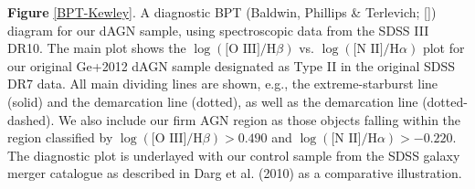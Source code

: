 \label{BPT-Kewley} \textbf{Figure} \ref{BPT-Kewley}. A diagnostic BPT (Baldwin, Phillips \& Terlevich; [\cite{Baldwin_1981}]) diagram for our dAGN sample, using spectroscopic data from the SDSS III DR10. The main plot shows the $\log(\text{[O III]}/\text{H}\beta)$ vs. $\log(\text{[N II]}/\text{H}\alpha)$ plot for our original Ge+2012 dAGN sample designated as Type II in the original SDSS DR7 data. All main dividing lines are shown, e.g., the \cite{Kewley_Dopita_Sutherland_Heisler_Trevena_2001} extreme-starburst line (solid) and the \cite{Kauffmann_2003} demarcation line (dotted), as well as the \cite{Stasinska_2006} demarcation line (dotted-dashed). We also include our firm AGN region as those objects falling within the region classified by $\log(\text{[O III]}/\text{H}\beta)>{0.490}$ and $\log(\text{[N II]}/\text{H}\alpha)>{-0.220}$. The diagnostic plot is underlayed with our control sample from the SDSS galaxy merger catalogue as described in Darg et al. (2010) as a comparative illustration. 
  